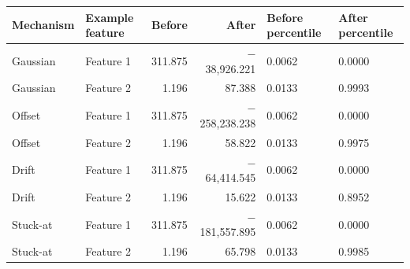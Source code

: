 \begin{tabular}{llrrll}
\toprule
Mechanism & Example feature & Before & After & Before percentile & After percentile \\
\midrule
Gaussian & Feature 1 & 311.875 & $-$38,926.221 & 0.0062 & 0.0000 \\
Gaussian & Feature 2 & 1.196 & 87.388 & 0.0133 & 0.9993 \\
Offset & Feature 1 & 311.875 & $-$258,238.238 & 0.0062 & 0.0000 \\
Offset & Feature 2 & 1.196 & 58.822 & 0.0133 & 0.9975 \\
Drift & Feature 1 & 311.875 & $-$64,414.545 & 0.0062 & 0.0000 \\
Drift & Feature 2 & 1.196 & 15.622 & 0.0133 & 0.8952 \\
Stuck-at & Feature 1 & 311.875 & $-$181,557.895 & 0.0062 & 0.0000 \\
Stuck-at & Feature 2 & 1.196 & 65.798 & 0.0133 & 0.9985 \\
\bottomrule
\end{tabular}

